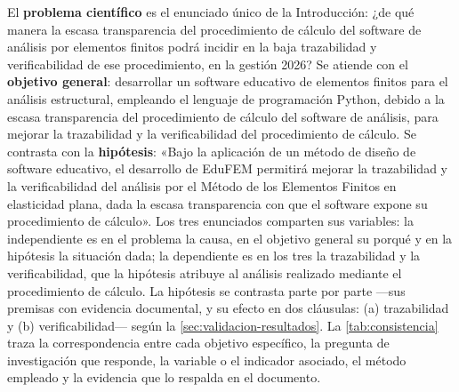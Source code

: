 El \textbf{problema científico} es el enunciado único de la Introducción: ¿de qué manera la escasa transparencia del procedimiento de cálculo del software de análisis por elementos finitos podrá incidir en la baja trazabilidad y verificabilidad de ese procedimiento, en la gestión 2026? Se atiende con el \textbf{objetivo general}: desarrollar un software educativo de elementos finitos para el análisis estructural, empleando el lenguaje de programación Python, debido a la escasa transparencia del procedimiento de cálculo del software de análisis, para mejorar la trazabilidad y la verificabilidad del procedimiento de cálculo. Se contrasta con la \textbf{hipótesis}: «Bajo la aplicación de un método de diseño de software educativo, el desarrollo de EduFEM permitirá mejorar la trazabilidad y la verificabilidad del análisis por el Método de los Elementos Finitos en elasticidad plana, dada la escasa transparencia con que el software expone su procedimiento de cálculo». Los tres enunciados comparten sus variables: la independiente es en el problema la causa, en el objetivo general su porqué y en la hipótesis la situación dada; la dependiente es en los tres la trazabilidad y la verificabilidad, que la hipótesis atribuye al análisis realizado mediante el procedimiento de cálculo. La hipótesis se contrasta parte por parte ---sus premisas con evidencia documental, y su efecto en dos cláusulas: (a) trazabilidad y (b) verificabilidad--- según la \autoref{sec:validacion-resultados}. La \autoref{tab:consistencia} traza la correspondencia entre cada objetivo específico, la pregunta de investigación que responde, la variable o el indicador asociado, el método empleado y la evidencia que lo respalda en el documento.

